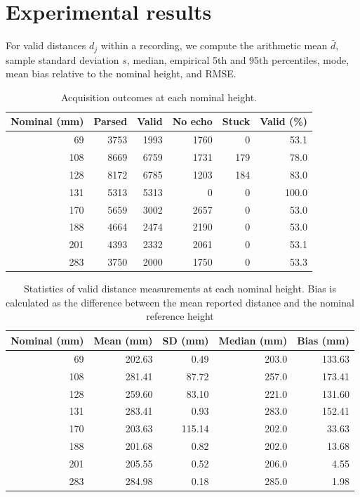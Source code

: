 \documentclass[11pt,a4paper]{article}
\begin{document}
\section{Experimental results}
\label{sec:org66fa5d2}
For valid distances \(d_j\) within a recording, we compute the arithmetic mean \(\bar d\), sample standard deviation \(s\), median, empirical 5th and 95th percentiles, mode, mean bias relative to the nominal height, and RMSE.

\begin{table}[H]
\caption{Acquisition outcomes at each nominal height.}
\centering
\begin{tabular}{rrrrrr}
Nominal (mm) & Parsed & Valid & No echo & Stuck & Valid (\%)\\
\hline
69 & 3753 & 1993 & 1760 & 0 & 53.1\\
108 & 8669 & 6759 & 1731 & 179 & 78.0\\
128 & 8172 & 6785 & 1203 & 184 & 83.0\\
131 & 5313 & 5313 & 0 & 0 & 100.0\\
170 & 5659 & 3002 & 2657 & 0 & 53.0\\
188 & 4664 & 2474 & 2190 & 0 & 53.0\\
201 & 4393 & 2332 & 2061 & 0 & 53.1\\
283 & 3750 & 2000 & 1750 & 0 & 53.3\\
\end{tabular}
\end{table}

\begin{table}[H]
\caption{Statistics of valid distance measurements at each nominal height. Bias is calculated as the difference between the mean reported distance and the nominal reference height}
\centering
\begin{tabular}{rrrrr}
Nominal (mm) & Mean (mm) & SD (mm) & Median (mm) & Bias (mm)\\
\hline
69 & 202.63 & 0.49 & 203.0 & 133.63\\
108 & 281.41 & 87.72 & 257.0 & 173.41\\
128 & 259.60 & 83.10 & 221.0 & 131.60\\
131 & 283.41 & 0.93 & 283.0 & 152.41\\
170 & 203.63 & 115.14 & 202.0 & 33.63\\
188 & 201.68 & 0.82 & 202.0 & 13.68\\
201 & 205.55 & 0.52 & 206.0 & 4.55\\
283 & 284.98 & 0.18 & 285.0 & 1.98\\
\end{tabular}
\end{table}
\end{document}
